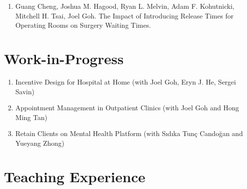 \documentclass[12pt, a4paper]{article}
\begin{document}
{\begin{enumerate}[leftmargin=30pt, resume]
	\begin{itemize}
		\item {\footnotesize Finalist, 2025 POMS PITM Best Student Paper Competition}
		\item {\footnotesize Select for presentation at Workshop on Empirical Operations Management 2025}
	\end{itemize}

	\item Guang Cheng, Joshua M. Hagood, Ryan L. Melvin, Adam F. Kohutnicki, Mitchell H. Tsai, Joel Goh. The Impact of Introducing Release Times for Operating Rooms on Surgery Waiting Times.

\end{enumerate}




\section*{Work-in-Progress}

\begin{enumerate}[leftmargin=30pt, resume]

	\item Incentive Design for Hospital at Home (with Joel Goh, Eryn J. He, Sergei Savin)
	
	\item Appointment Management in Outpatient Clinics (with Joel Goh and Hong Ming Tan)
	
	\item Retain Clients on Mental Health Platform (with S\i{}d\i{}ka Tun\c{c} Cando\u{g}an and Yueyang Zhong) 
	
\end{enumerate}




\section*{Teaching Experience}
\begin{itemize}


\end{itemize}}
\end{document}
